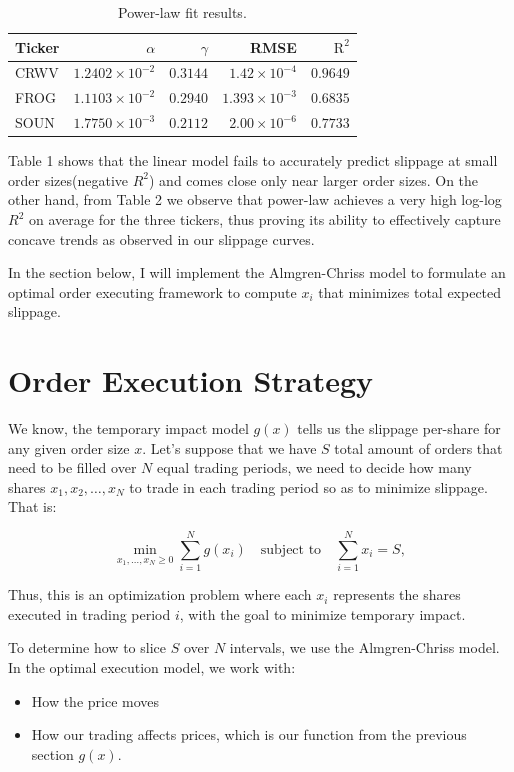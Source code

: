 \documentclass[12pt, letterpaper]{article}
\begin{document}
\begin{table}[htbp] 
\centering
\begin{tabular}{lrrrr}
\toprule
Ticker & $\alpha$ & $\gamma$ & RMSE & $\mathrm{R}^2$ \\
\midrule
CRWV  & $1.2402\times10^{-2}$ & $0.3144$ & $1.42\times10^{-4}$ & $0.9649$ \\
FROG  & $1.1103\times10^{-2}$ & $0.2940$ & $1.393\times10^{-3}$ & $0.6835$ \\
SOUN  & $1.7750\times10^{-3}$ & $0.2112$ & $2.00\times10^{-6}$ & $0.7733$ \\
\bottomrule
\end{tabular}
\caption{Power-law fit results.}
\end{table}

\FloatBarrier 


Table 1 shows that the linear model fails to accurately predict slippage at small order sizes(negative $R^2$) and comes close only near larger order sizes. On the other hand, from Table 2 we observe that power-law achieves a very high log-log $R^2$ on average for the three tickers, thus proving its ability to effectively capture concave trends as observed in our slippage curves.

In the section below, I will implement the Almgren-Chriss model to formulate an optimal order executing framework to compute $x_i$ that minimizes total expected slippage. 
\section{Order Execution Strategy}

We know, the temporary impact model $g(x)$ tells us the slippage per-share for any given order size $x$. Let's suppose that we have $S$ total amount of orders that need to be filled over $N$ equal trading periods, we need to decide how many shares $x_1, x_2, \ldots, x_N$ to trade in each trading period so as to minimize slippage. That is:

\[
  \min_{x_1,\dots,x_N\ge0}
    \sum_{i=1}^N g(x_i)
  \quad \text{subject to} \quad
    \sum_{i=1}^N x_i = S,
\]


Thus, this is an optimization problem where each $x_i$ represents the shares executed in trading period $i$, with the goal to minimize temporary impact.

To determine how to slice $S$ over $N$ intervals, we use the Almgren-Chriss model. In the optimal execution model, we work with:
\begin{itemize}
    \item How the price moves 
    \item How our trading affects prices, which is our function from the previous section $g(x)$.
\end{itemize}
\end{document}
